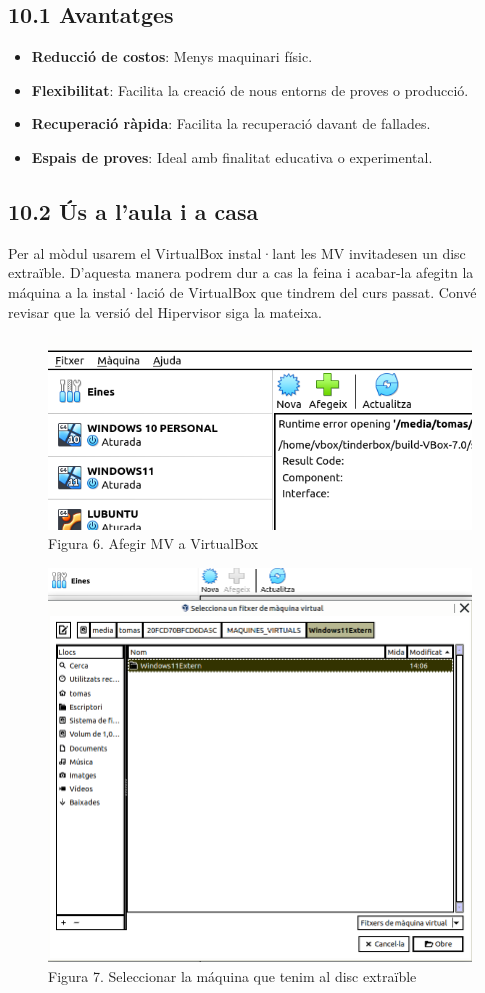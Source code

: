 \documentclass[
  a4paper,
]{article}
\providecommand{\tightlist}{%
  \setlength{\itemsep}{0pt}\setlength{\parskip}{0pt}}
\begin{document}
\subsection{10.1 Avantatges}\label{avantatges}

\begin{itemize}
\tightlist
\item
  \textbf{Reducció de costos}: Menys maquinari físic.
\item
  \textbf{Flexibilitat}: Facilita la creació de nous entorns de proves o
  producció.
\item
  \textbf{Recuperació ràpida}: Facilita la recuperació davant de
  fallades.
\item
  \textbf{Espais de proves}: Ideal amb finalitat educativa o
  experimental.
\end{itemize}

\subsection{10.2 Ús a l'aula i a casa}\label{uxfas-a-laula-i-a-casa}

Per al mòdul usarem el VirtualBox instal·lant les MV invitadesen un disc
extraïble. D'aquesta manera podrem dur a cas la feina i acabar-la
afegitn la máquina a la instal·lació de VirtualBox que tindrem del curs
passat. Convé revisar que la versió del Hipervisor siga la mateixa.

\begin{figure}
\centering
\includegraphics{png/afegeixMV.png}
\caption{Figura 6. Afegir MV a VirtualBox}
\end{figure}

\begin{figure}
\centering
\includegraphics{png/afegeixMV2.png}
\caption{Figura 7. Seleccionar la máquina que tenim al disc extraïble}
\end{figure}
\end{document}
